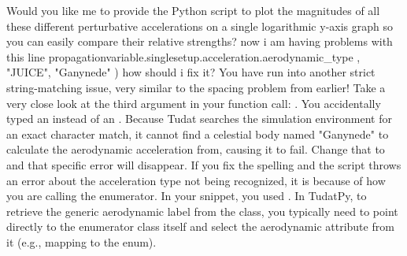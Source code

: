 {}\markdownRendererThematicBreak{}\markdownRendererInterblockSeparator
{}Would you like me to provide the Python script to plot the magnitudes of all these different perturbative accelerations on a single logarithmic y-axis graph so you can easily compare their relative strengths?\markdownRendererInterblockSeparator
{}\markdownRendererThematicBreak{}\markdownRendererInterblockSeparator
{}
\markdownRendererSectionEnd 
\markdownRendererSectionEnd \markdownRendererSectionBegin
{}\markdownRendererInterblockSeparator
{}now i am having problems with this line propagationvariable.singlesetup.acceleration.aerodynamic_type , "JUICE", "Ganynede" ) how should i fix it?\markdownRendererInterblockSeparator
{}
\markdownRendererSectionEnd \markdownRendererSectionBegin
{}\markdownRendererInterblockSeparator
{}\markdownRendererSectionBegin
{}\markdownRendererInterblockSeparator
{}You have run into another strict string-matching issue, very similar to the spacing problem from earlier!\markdownRendererInterblockSeparator
{}Take a very close look at the third argument in your function call: . You accidentally typed an  instead of an .\markdownRendererInterblockSeparator
{}Because Tudat searches the simulation environment for an exact character match, it cannot find a celestial body named "Ganynede" to calculate the aerodynamic acceleration from, causing it to fail. Change that to  and that specific error will disappear.\markdownRendererInterblockSeparator
{}
\markdownRendererSectionEnd \markdownRendererSectionBegin
{}\markdownRendererInterblockSeparator
{}If you fix the spelling and the script  throws an error about the acceleration type not being recognized, it is because of how you are calling the  enumerator.\markdownRendererInterblockSeparator
{}In your snippet, you used . In TudatPy, to retrieve the generic aerodynamic label from the  class, you typically need to point directly to the enumerator class itself and select the aerodynamic attribute from it (e.g., mapping to the  enum).\markdownRendererInterblockSeparator

